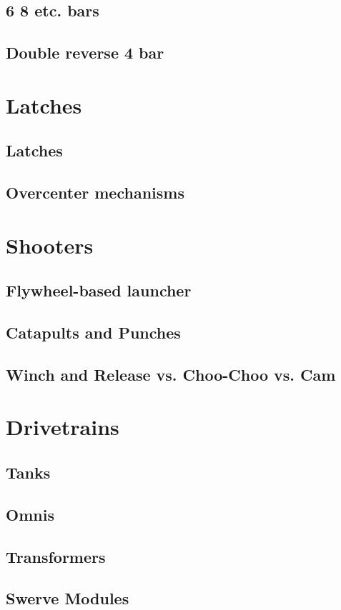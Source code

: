 \documentclass[10pt,letterpaper]{book}
\begin{document}
\subsection{6 8 etc. bars}
\subsection{Double reverse 4 bar}

\section{Latches}
\subsection{Latches}
\subsection{Overcenter mechanisms}

\section{Shooters}
\subsection{Flywheel-based launcher}
\subsection{Catapults and Punches}
\subsection{Winch and Release vs. Choo-Choo vs. Cam}

\section{Drivetrains}
\subsection{Tanks}
\subsection{Omnis}
\subsection{Transformers}
\subsection{Swerve Modules}
\end{document}
